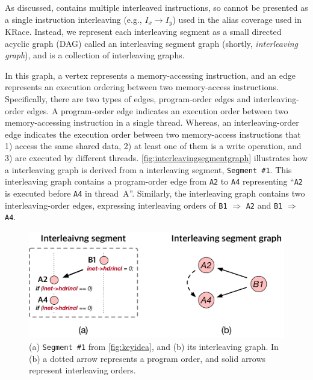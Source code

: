 As discussed, \intcov contains multiple interleaved instructions, 
so \intcov cannot be presented as a single instruction interleaving 
(e.g., $I_x \rightarrow I_y$) used in the alias coverage used in KRace.
Instead, we represent each interleaving segment as a small directed acyclic
graph (DAG) called an interleaving segment graph (shortly, \textit{interleaving graph}), and \intcov is a collection of interleaving graphs.

In this graph, a vertex represents a memory-accessing instruction, 
and an edge represents an execution ordering between two memory-access instructions. 
Specifically, there are two types of edges, program-order edges and
interleaving-order edges.
%
A program-order edge indicates an execution order between two 
memory-accessing instruction in a single thread.
Whereas, an interleaving-order edge indicates the execution
order between two memory-access instructions that 1) access the same
shared data, 2) at least one of them is a write operation, and 3) are
executed by different threads.
\autoref{fig:interleavingsegmentgraph} illustrates how a interleaving 
graph is derived from a interleaving segment, \texttt{Segment \#1}.
This interleaving graph contains a program-order edge from \texttt{A2} to
\texttt{A4} representing ``\texttt{A2} is executed before \texttt{A4}
in thread~A''.
Similarly, the interleaving graph contains two interleaving-order
edges, expressing interleaving orders of \texttt{B1} $\Rightarrow$ \texttt{A2}
and \texttt{B1} $\Rightarrow$ \texttt{A4}.



\begin{figure}[t]
  \centering
  \includegraphics[width=0.9\linewidth]{fig/interleavingsegmentgraph.pdf}
  \caption{(a) \texttt{Segment \#1} from \autoref{fig:keyidea}, and
    (b) its interleaving graph. In (b) a dotted arrow represents a program
    order, and solid arrows represent interleaving orders.}
  \label{fig:interleavingsegmentgraph}
\end{figure}

